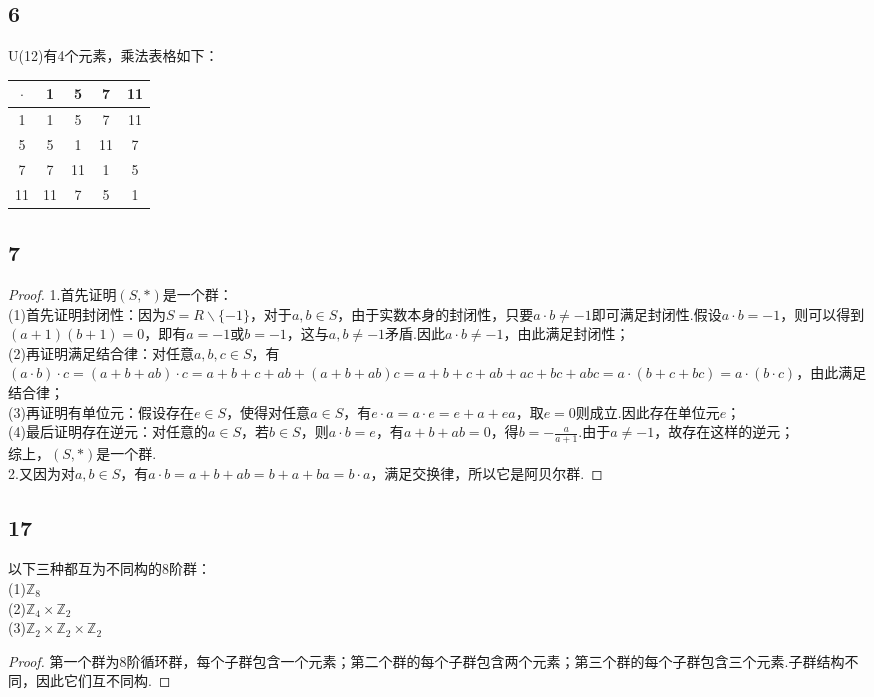 \documentclass[twocolumn]{article}
\newenvironment{SChinese}{
	\CJKfamily{gbsn}
	\CJKtilde
	\CJKnospace}{}
\begin{document}
\begin{CJK}{UTF8}{}
\begin{SChinese}
				\subsection*{6}
					U(12)有4个元素，乘法表格如下：\\
					\begin{tabular}{c|cccc}
						$\cdot$ & 1 & 5 & 7 & 11 \\
						\hline
						1 & 1 & 5 & 7 & 11 \\
						5 & 5 & 1 & 11 & 7 \\
						7 & 7 & 11 & 1 & 5 \\
						11 & 11 & 7 & 5 & 1 \\
					\end{tabular}
				\subsection*{7}
					\begin{proof}
						1.首先证明$(S,*)$是一个群：\\
						(1)首先证明封闭性：因为$S=R\backslash\{-1\}$，对于$a,b\in S$，由于实数本身的封闭性，只要$a\cdot b\neq-1$即可满足封闭性.假设$a\cdot b=-1$，则可以得到$(a+1)(b+1)=0$，即有$a=-1$或$b=-1$，这与$a,b\neq-1$矛盾.因此$a\cdot b\neq-1$，由此满足封闭性；\\
						(2)再证明满足结合律：对任意$a,b,c\in S$，有$(a\cdot b)\cdot c=(a+b+ab)\cdot c=a+b+c+ab+(a+b+ab)c=a+b+c+ab+ac+bc+abc=a\cdot(b+c+bc)=a\cdot(b\cdot c)$，由此满足结合律；\\
						(3)再证明有单位元：假设存在$e\in S$，使得对任意$a\in S$，有$e\cdot a=a\cdot e=e+a+ea$，取$e=0$则成立.因此存在单位元$e$；\\
						(4)最后证明存在逆元：对任意的$a\in S$，若$b\in S$，则$a\cdot b=e$，有$a+b+ab=0$，得$b=-\frac{a}{a+1}$.由于$a\neq-1$，故存在这样的逆元；\\
						综上，$(S,*)$是一个群.\\
						2.又因为对$a,b\in S$，有$a\cdot b=a+b+ab=b+a+ba=b\cdot a$，满足交换律，所以它是阿贝尔群.
					\end{proof}
				\subsection*{17}
					以下三种都互为不同构的8阶群：\\
					(1)$\mathbb{Z}_8$ \\
					(2)$\mathbb{Z}_4\times\mathbb{Z}_2$ \\
					(3)$\mathbb{Z}_2\times\mathbb{Z}_2\times\mathbb{Z}_2$ \\
					\begin{proof}
						第一个群为8阶循环群，每个子群包含一个元素；第二个群的每个子群包含两个元素；第三个群的每个子群包含三个元素.子群结构不同，因此它们互不同构.
					\end{proof}

\end{SChinese}
\end{CJK}
\end{document}
